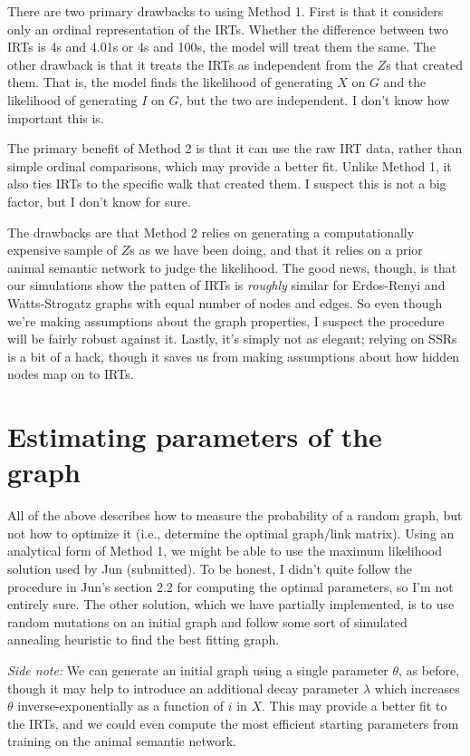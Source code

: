 \documentclass{article}
\begin{document}
\vspace{5mm}

There are two primary drawbacks to using Method 1. First is that it considers
only an ordinal representation of the IRTs. Whether the difference between two
IRTs is 4s and 4.01s or 4s and 100s, the model will treat them the same. The
other drawback is that it treats the IRTs as independent from the $Z$s that
created them. That is, the model finds the likelihood of generating $X$ on $G$
and the likelihood of generating $I$ on $G$, but the two are independent. I
don't know how important this is.

\vspace{5mm}

The primary benefit of Method 2 is that it can use the raw IRT data, rather
than simple ordinal comparisons, which may provide a better fit. Unlike Method
1, it also ties IRTs to the specific walk that created them. I suspect this is
not a big factor, but I don't know for sure.

\vspace{5mm}

The drawbacks are that Method 2 relies on generating a computationally
expensive sample of $Z$s as we have been doing, and that it relies on a prior
animal semantic network to judge the likelihood. The good news, though, is that
our simulations show the patten of IRTs is \emph{roughly} similar for
Erdos-Renyi and Watts-Strogatz graphs with equal number of nodes and edges. So
even though we're making assumptions about the graph properties, I suspect the
procedure will be fairly robust against it. Lastly, it's simply not as elegant;
relying on SSRs is a bit of a hack, though it saves us from making assumptions
about how hidden nodes map on to IRTs.

\section{Estimating parameters of the graph}

All of the above describes how to measure the probability of a random graph,
but not how to optimize it (i.e., determine the optimal graph/link matrix).
Using an analytical form of Method 1, we might be able to use the maximum
likelihood solution used by Jun (submitted). To be honest, I didn't quite
follow the procedure in Jun's section 2.2 for computing the optimal parameters,
so I'm not entirely sure. The other solution, which we have partially
implemented, is to use random mutations on an initial graph and follow some
sort of simulated annealing heuristic to find the best fitting graph.

\vspace{5mm}

\emph{Side note:} We can generate an initial graph using a single parameter
$\theta$, as before, though it may help to introduce an additional decay
parameter $\lambda$ which increases $\theta$ inverse-exponentially as a
function of $i$ in $X$. This may provide a better fit to the IRTs, and we could
even compute the most efficient starting parameters from training on the animal
semantic network.
\end{document}
